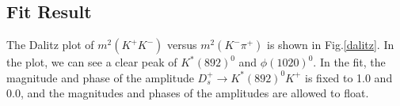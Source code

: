 \subsection{Fit Result}
\par{
    The Dalitz plot of $m^{2}(K^{+}K^{-})$ versus $m^{2}(K^{-}\pi^{+})$ is shown in Fig.\ref{dalitz}. In the plot, we can see a clear peak of $K^{*}(892)^{0}$ and $\phi(1020)^{0}$. 
In the fit, the magnitude and phase of the amplitude $D_{s}^{+} \rightarrow K^{*}(892)^{0}K^{+}$ is fixed to 1.0 and 0.0, and the magnitudes and phases of the amplitudes are allowed to float. 


}
